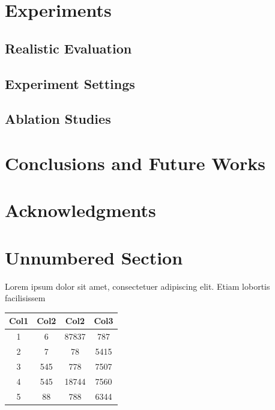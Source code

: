 \documentclass[12pt]{article}
\theoremstyle{definition}
\DeclareRobustCommand{\[}{\begin{equation}}
\DeclareRobustCommand{\]}{\end{equation}}
\begin{document}
\section{Experiments}
    \subsection{Realistic Evaluation}
    \subsection{Experiment Settings}
    \subsection{Ablation Studies}

\section{Conclusions and Future Works}
\section{Acknowledgments}

\medskip





\section{Unnumbered Section}
Lorem ipsum dolor sit amet, consectetuer adipiscing elit.  
Etiam lobortis facilisissem

\begin{center}
 \begin{tabular}{||c c c c||} 
 \hline
 Col1 & Col2 & Col2 & Col3 \\ [0.5ex] 
 \hline\hline
 1 & 6 & 87837 & 787 \\ 
 \hline
 2 & 7 & 78 & 5415 \\
 \hline
 3 & 545 & 778 & 7507 \\
 \hline
 4 & 545 & 18744 & 7560 \\
 \hline
 5 & 88 & 788 & 6344 \\ [1ex] 
 \hline
\end{tabular}
\end{center}
\end{document}
